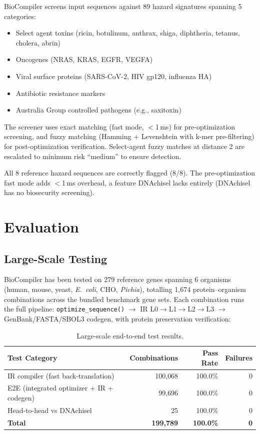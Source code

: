 \documentclass[11pt,a4paper]{article}
\theoremstyle{definition}
\begin{document}
BioCompiler screens input sequences against 89 hazard signatures spanning 5 categories:

\begin{itemize}[leftmargin=*,itemsep=1pt]
\item Select agent toxins (ricin, botulinum, anthrax, shiga, diphtheria, tetanus, cholera, abrin)
\item Oncogenes (NRAS, KRAS, EGFR, VEGFA)
\item Viral surface proteins (SARS-CoV-2, HIV gp120, influenza HA)
\item Antibiotic resistance markers
\item Australia Group controlled pathogens (e.g., saxitoxin)
\end{itemize}

The screener uses exact matching (fast mode, $<$1\,ms) for pre-optimization screening, and fuzzy matching (Hamming + Levenshtein with k-mer pre-filtering) for post-optimization verification. Select-agent fuzzy matches at distance 2 are escalated to minimum risk ``medium'' to ensure detection.

All 8 reference hazard sequences are correctly flagged (8/8). The pre-optimization fast mode adds $<$1\,ms overhead, a feature DNAchisel lacks entirely (DNAchisel has no biosecurity screening).

\clearpage
\section{Evaluation}\label{sec:eval}

\subsection{Large-Scale Testing}

BioCompiler has been tested on 279 reference genes spanning 6 organisms (human, mouse, yeast, \textit{E.~coli}, CHO, \textit{Pichia}), totalling 1{,}674 protein--organism combinations across the bundled benchmark gene sets. Each combination runs the full pipeline: \texttt{optimize\_sequence()} $\to$ IR L0$\to$L1$\to$L2$\to$L3 $\to$ GenBank/FASTA/SBOL3 codegen, with protein preservation verification:

\begin{table}[!ht]
\centering
\begin{tabular}{lrrr}
\toprule
\textbf{Test Category} & \textbf{Combinations} & \textbf{Pass Rate} & \textbf{Failures} \\
\midrule
IR compiler (fast back-translation) & 100{,}068 & 100.0\% & 0 \\
E2E (integrated optimizer + IR + codegen) & 99{,}696 & 100.0\% & 0 \\
Head-to-head vs DNAchisel & 25 & 100.0\% & 0 \\
\midrule
\textbf{Total} & \textbf{199{,}789} & \textbf{100.0\%} & \textbf{0} \\
\bottomrule
\end{tabular}
\caption{Large-scale end-to-end test results.}
\label{tab:tests}
\end{table}
\end{document}
